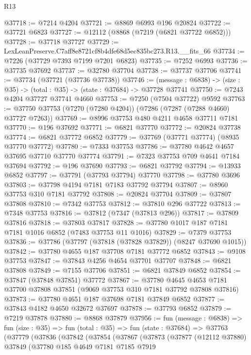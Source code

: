 \begin{lexlean}{R13}
\begin{coremodule}
@37718 := @7214 @4204
@37721 := @8869 @6993 @196 @20824
@37722 := @37721 @6823
@37727 := @12112 (@8868 (@7219 (@6821 @37722 @6852)))
@37728 := @37718 @37727
@37729 := LexLeanPreserve.C7aff8e8721cf8b4dfe68d5ec835bc273.R13.__fits_66
@37734 := @7226 (@37729 @7393 @7199 @7201 @6823)
@37735 := @7252 @6993
@37736 := @37735 @37692
@37737 := @32780 @37704
@37738 := @37737 @37706
@37741 := @37734 (@37721 (@37736 @37738))
@37746 := (message : @6838) -> (size : @35) -> (total : @35) -> (state : @37684) -> @37728 @37741
@37750 := @7243 @4204 @37727 @37741 @4660
@37753 := @7250 (@7504 @37722) @9592
@37763 := @37750 @37753 (@7270 (@7280 @4204)) (@7286 (@7287 (@7288 @4660) @37727 @7263))
@37769 := @8996 @37753 @480 @4211 @4658 @37711 @7181
@37770 := @196 @37692
@37771 := @6821 @37770
@37772 := @20824 @37738
@37774 := @6821 @37772 @6852
@37779 := @37769 (@37771 @37774) (@8935 @37770 @37772)
@37780 := @7333 @37753
@37786 := @37780 @4642 @4657 @37695 @37710 @37770 @37774
@37791 := @7323 @37753 @709 @4641 @7184 @37694
@37792 := @196 @37690
@37793 := @6821 @37792
@37794 := @13933 @6852
@37797 := @37791 (@37793 @37794) @37770
@37798 := @37780 @3696
@37803 := @37798 @4194 @7181 @7183 @37792 @37794
@37807 := @8960 @37753 @310 @7181 @37792
@37808 := @20824 @37704
@37809 := @37807 @37808
@37810 := @7342 @37753
@37812 := @37810 @296 @37722
@37813 := @7348 @37753
@37816 := @37812 (@7347 (@37813 @296))
@37817 := @37809 @37816
@37818 := @37803 @37817
@37828 := @37780 @1017 @187 @7181 @7181 @1016 @6852 (@7483 @37753 @11 @1016)
@37829 := @7379 @37753
@37836 := @37786 (@37797 (@37818 (@37828 @37829)) (@8247 @37690 @1015))
@37842 := @37780 @4655 @187 @37708 @7181 @37772 @6852
@37843 := @9108 @37753
@37847 := @37843 @4256 @4654 @37701 @37707
@37848 := @6821 @37808
@37849 := @7155 @37706
@37851 := @6821 @37849 @6852
@37854 := @37847 (@37848 @37851) @37772
@37867 := @37780
    @4645
    @4653
    @7181
    @37700
    @37808
    @37851
    (@9069 @37753 @310 @7181 @37792 @37808 @37816)
@37873 := @37780 @4651 @187 @37698 @7181 @37849 @6852
@37877 := @37843 @4182 @4650 @32672 @37697
@37878 := @37793 @6852
@37879 := @7219 @37878
@37880 := @8868 @37879
@37956 := fun (message : @6838) =>
  fun (size : @35) =>
  fun (total : @35) =>
  fun (state : @37684) =>
  @37763
    (@37779
      (@37836
        (@37842
          (@37854
            (@37867
              (@37873
                (@37877
                  (@12112 @37880)
                  @37849
                  (@37780
                    @185
                    @4649
                    @7181
                    @7185
                    @7919

\end{coremodule}
\end{lexlean}

